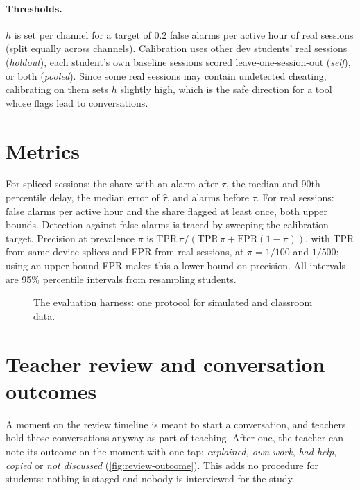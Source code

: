 \paragraph{Thresholds.} $h$ is set per channel for a target of 0.2 false alarms per
active hour of real sessions (split equally across channels). Calibration uses other
dev students' real sessions (\emph{holdout}), each student's own baseline sessions
scored leave-one-session-out (\emph{self}), or both (\emph{pooled}). Since some real
sessions may contain undetected cheating, calibrating on them sets $h$ slightly high,
which is the safe direction for a tool whose flags lead to conversations.

\section{Metrics}
For spliced sessions: the share with an alarm after $\tau$, the median and
90th-percentile delay, the median error of $\hat\tau$, and alarms before $\tau$. For real
sessions: false alarms per active hour and the share flagged at least once, both upper
bounds. Detection against false alarms is traced by sweeping the calibration target.
Precision at prevalence $\pi$ is $\mathrm{TPR}\,\pi/(\mathrm{TPR}\,\pi +
\mathrm{FPR}(1-\pi))$, with TPR from same-device splices and FPR from real sessions, at
$\pi = 1/100$ and $1/500$; using an upper-bound FPR makes this a lower bound on
precision. All intervals are 95\% percentile intervals from resampling students.

\begin{figure}[ht]
  \centering
  \caption{The evaluation harness: one protocol for simulated and classroom data.}
  \label{fig:harness}
\end{figure}

\section{Teacher review and conversation outcomes}
\label{sec:teacher-review}
A moment on the review timeline is meant to start a conversation, and teachers hold
those conversations anyway as part of teaching. After one, the teacher can note its
outcome on the moment with one tap: \emph{explained, own work}, \emph{had help},
\emph{copied} or \emph{not discussed} (\cref{fig:review-outcome}). This adds no
procedure for students: nothing is staged and nobody is interviewed for the study.

